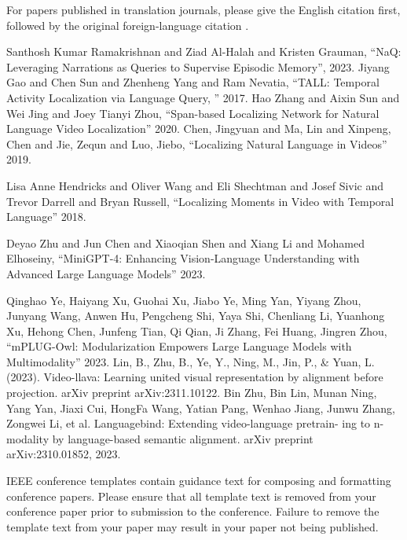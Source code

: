 \documentclass[conference]{IEEEtran}
\begin{document}
For papers published in translation journals, please give the English 
citation first, followed by the original foreign-language citation \cite{b6}.

\begin{thebibliography}{00}
 Santhosh Kumar Ramakrishnan and Ziad Al-Halah and Kristen Grauman, ``NaQ: Leveraging Narrations as Queries to Supervise Episodic Memory'', 2023.
 Jiyang Gao and Chen Sun and Zhenheng Yang and Ram Nevatia, ``TALL: Temporal Activity Localization via Language Query, '' 2017.
 Hao Zhang and Aixin Sun and Wei Jing and Joey Tianyi Zhou, ``Span-based Localizing Network for Natural Language Video Localization'' 2020.
 Chen, Jingyuan and Ma, Lin and Xinpeng, Chen and Jie, Zequn and Luo, Jiebo, ``Localizing Natural Language in Videos'' 2019.

 Lisa Anne Hendricks and Oliver Wang and Eli Shechtman and Josef Sivic and Trevor Darrell and Bryan Russell, ``Localizing Moments in Video with Temporal Language'' 2018.

 Deyao Zhu and Jun Chen and Xiaoqian Shen and Xiang Li and Mohamed Elhoseiny, ``MiniGPT-4: Enhancing Vision-Language Understanding with Advanced Large Language Models'' 2023.

 Qinghao Ye, Haiyang Xu, Guohai Xu, Jiabo Ye, Ming Yan, Yiyang Zhou, Junyang Wang, Anwen Hu, Pengcheng Shi, Yaya Shi, Chenliang Li, Yuanhong Xu, Hehong Chen, Junfeng Tian, Qi Qian, Ji Zhang, Fei Huang, Jingren Zhou, ``mPLUG-Owl: Modularization Empowers Large Language Models with Multimodality'' 2023.
 Lin, B., Zhu, B., Ye, Y., Ning, M., Jin, P., & Yuan, L. (2023). Video-llava: Learning united visual representation by alignment before projection. arXiv preprint arXiv:2311.10122.
Bin Zhu, Bin Lin, Munan Ning, Yang Yan, Jiaxi Cui, HongFa Wang, Yatian Pang, Wenhao Jiang, Junwu Zhang, Zongwei Li, et al. Languagebind: Extending video-language pretrain- ing to n-modality by language-based semantic alignment. arXiv preprint arXiv:2310.01852, 2023.

\end{thebibliography}
\vspace{12pt}
\color{red}
IEEE conference templates contain guidance text for composing and formatting conference papers. Please ensure that all template text is removed from your conference paper prior to submission to the conference. Failure to remove the template text from your paper may result in your paper not being published.
\end{document}
